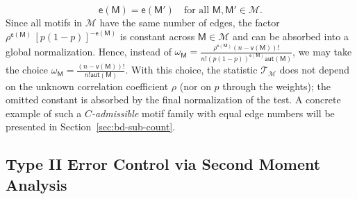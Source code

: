 \documentclass[letterpaper,11pt]{article}
\theoremstyle{definition}
\newcommand{\maM}{\mathcal{M}}
\newcommand{\maT}{\mathcal{T}}
\newcommand{\en}{\mathsf{{e}}}
\newcommand{\vn}{\mathsf{{v}}}
\newcommand{\sfM}{{\mathsf{M}}}
\newcommand{\aut}{\mathsf{aut}}
\begin{document}
\[
\en(\sfM) = \en(\sfM') \quad \text{for all } \sfM,\sfM' \in \maM.
\]
Since all motifs in \(\mathcal M\) have the same number of edges, the factor $\rho^{\en(\sfM)}\,[p(1-p)]^{-\en(\sfM)}$
is constant across \(\sfM\in \maM\) and can be absorbed into a global normalization. Hence, instead of $\omega_{\sfM}=\frac{\rho^{\en(\sfM)}(n-\vn(\sfM))!}{n!(p(1-p))^{\en(\sfM)}\aut(\sfM)}$,
we may take the  choice $\omega_{\sfM}=\frac{(n-\vn(\sfM))!}{n!\aut(\sfM)}$.
With this choice, the statistic $\maT_\maM$ does not depend on the unknown correlation coefficient \(\rho\) (nor on \(p\) through the weights); the omitted constant is absorbed by the final normalization of the test.
A concrete example of such a \emph{$C$-admissible} motif family with equal edge numbers will be presented in Section~\ref{sec:bd-sub-count}.




\subsection{Type II Error Control via Second Moment Analysis}
\end{document}
